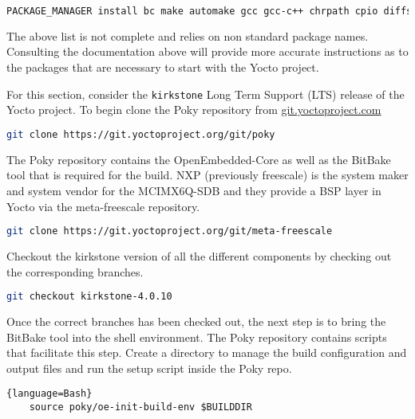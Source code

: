 
\begin{lstlisting}[language=Bash]
	PACKAGE_MANAGER install bc make automake gcc gcc-c++ chrpath cpio diffstat gawk git python texinfo wget
\end{lstlisting}

The above list is not complete and relies on non standard package names. Consulting the documentation above will provide more accurate instructions as to the packages that are necessary to start with the Yocto project.

For this section, consider the \texttt{kirkstone} Long Term Support (LTS) release of the Yocto project. To begin clone the Poky repository from \href{https://git.yoctoproject.com}{git.yoctoproject.com}

\begin{lstlisting}[language=Bash]
	git clone https://git.yoctoproject.org/git/poky
\end{lstlisting}

The Poky repository contains the OpenEmbedded-Core as well as the BitBake tool that is required for the build. NXP (previously freescale) is the system maker and system vendor for the MCIMX6Q-SDB and they provide a BSP layer in Yocto via the meta-freescale repository.

\begin{lstlisting}[language=Bash]
	git clone https://git.yoctoproject.org/git/meta-freescale
\end{lstlisting}

Checkout the kirkstone version of all the different components by checking out the corresponding branches.

\begin{lstlisting}[language=Bash]
	git checkout kirkstone-4.0.10
\end{lstlisting}

Once the correct branches has been checked out, the next step is to bring the BitBake tool into the shell environment. The Poky repository contains scripts that facilitate this step. Create a directory to manage the build configuration and output files and run the setup script inside the Poky repo.

\begin{lstlisting}{language=Bash}
	source poky/oe-init-build-env $BUILDDIR
\end{lstlisting}

